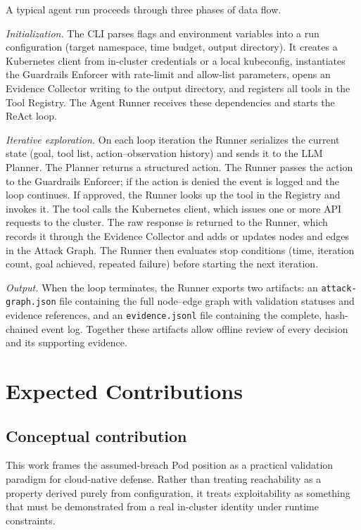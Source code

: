 \documentclass[conference]{IEEEtran}
\begin{document}
A typical agent run proceeds through three phases of data flow.

\emph{Initialization.} The CLI parses flags and environment variables into a run configuration (target namespace, time budget, output directory). It creates a Kubernetes client from in-cluster credentials or a local kubeconfig, instantiates the Guardrails Enforcer with rate-limit and allow-list parameters, opens an Evidence Collector writing to the output directory, and registers all tools in the Tool Registry. The Agent Runner receives these dependencies and starts the ReAct loop.

\emph{Iterative exploration.} On each loop iteration the Runner serializes the current state (goal, tool list, action--observation history) and sends it to the LLM Planner. The Planner returns a structured action. The Runner passes the action to the Guardrails Enforcer; if the action is denied the event is logged and the loop continues. If approved, the Runner looks up the tool in the Registry and invokes it. The tool calls the Kubernetes client, which issues one or more API requests to the cluster. The raw response is returned to the Runner, which records it through the Evidence Collector and adds or updates nodes and edges in the Attack Graph. The Runner then evaluates stop conditions (time, iteration count, goal achieved, repeated failure) before starting the next iteration.

\emph{Output.} When the loop terminates, the Runner exports two artifacts: an \texttt{attack-graph.json} file containing the full node--edge graph with validation statuses and evidence references, and an \texttt{evidence.jsonl} file containing the complete, hash-chained event log. Together these artifacts allow offline review of every decision and its supporting evidence.

\section{Expected Contributions}

\subsection{Conceptual contribution}
This work frames the assumed-breach Pod position as a practical validation paradigm for cloud-native defense. Rather than treating reachability as a property derived purely from configuration, it treats exploitability as something that must be demonstrated from a real in-cluster identity under runtime constraints.
\end{document}
